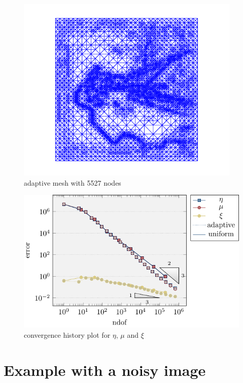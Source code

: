\documentclass[11p]{article}
\begin{document}
	\begin{figure}[H]
		\centering
		\includegraphics[trim = 0.9cm 0.35cm 0.9cm 0.2cm, width=\linewidth, angle=-90]{figures/imgProcessing/adaptTriangulation/adaptTriangulationLevel16}
		\caption{adaptive mesh with 5527 nodes}
	\end{figure}
	
	\begin{figure}[H]
		\centering
		\includegraphics[width=14cm]{figures/imgProcessing/convHistoryPlot/convergence.pdf}
		\caption{convergence history plot for $\eta$, $\mu$ and $\xi$}
	\end{figure}

	\section{Example with a noisy image}
	
\end{document}
